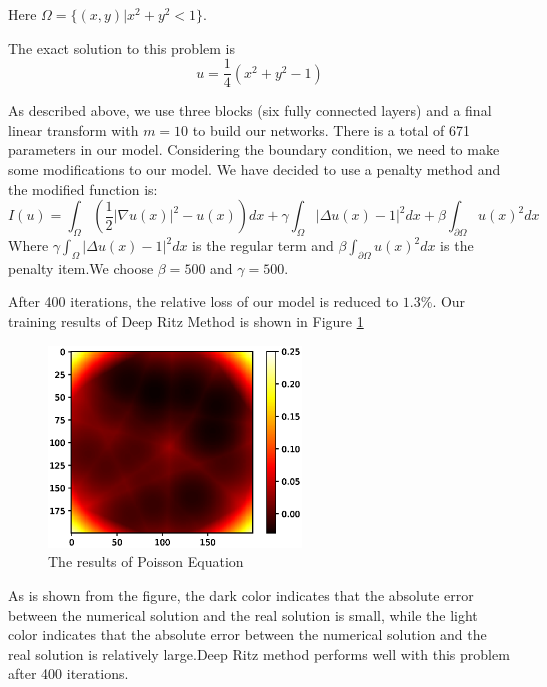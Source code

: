 \documentclass{article}
\begin{document}
Here $\Omega =\{(x,y)| x^2+y^2<1\}$.
\par The exact solution to this problem is 
\begin{equation}
u=\frac{1}{4}(x^2+y^2-1)
\end{equation}

\par As described above, we use three blocks (six fully connected layers) and a final linear transform with $m=10$ to build our networks. There is a total of 671 parameters in our model. Considering the boundary condition, we need to make some modifications to our model. We have decided to use a penalty method and the modified function is:
\begin{equation}\label{functional}
I(u)=\int_{\Omega}\left(\frac{1}{2}|\nabla u(x)|^2-u(x)\right)dx+\gamma\int_{\Omega}|\Delta u(x) - 1|^2dx+\beta\int_{\partial \Omega}u(x)^2dx
\end{equation}
Where $\gamma\int_{\Omega}|\Delta u(x) - 1|^2dx$ is the regular term and $\beta\int_{\partial \Omega}u(x)^2dx$ is the penalty item.We choose $\beta=500$ and $\gamma=500$.
\par After 400 iterations, the relative loss of our model is reduced to $1.3\%$. Our training results of Deep Ritz Method is shown in Figure \ref{3.1a}

\begin{figure}[ht]
 	 \centering
 	 \includegraphics[width=0.6\textwidth]{./images/loss_3-1.eps} 
	 \caption {The results of Poisson Equation}
	 \label{3.1a}
\end{figure}
As is shown from the figure, the dark color indicates that the absolute error between the numerical solution and the real solution is small, while the light color indicates that the absolute error between the numerical solution and the real solution is relatively large.Deep Ritz method performs well with this problem after 400 iterations.
\end{document}
